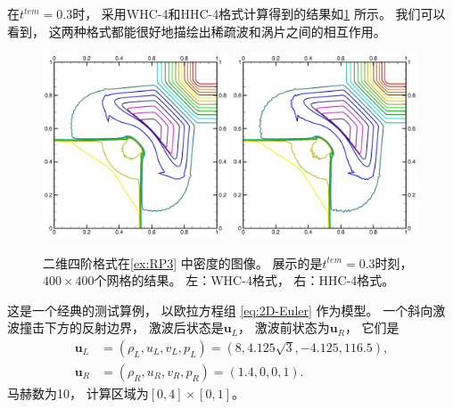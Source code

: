 在$t^{tem}=0.3$时，
采用WHC-4和HHC-4格式计算得到的结果如\cref{fig:RP3} 所示。
我们可以看到，
这两种格式都能很好地描绘出稀疏波和涡片之间的相互作用。

\begin{figure}[htbp]
  \centering
  \includegraphics[width=0.49\textwidth]{fig/2D/RP15_S2O4-WHC4_CFL0.600000.pdf}
  \includegraphics[width=0.49\textwidth]{fig/2D/RP15_S2O4-HHC4theta20_CFL0.600000.pdf}
  \caption{二维四阶格式在\cref{ex:RP3} 中密度的图像。
    展示的是$t^{tem}=0.3$时刻，
    \\$400 \times 400$个网格的结果。
    左：WHC-4格式，
    右：HHC-4格式。
  }
  \label{fig:RP3}
\end{figure}

\begin{example}[二维欧拉方程组的双马赫反射问题]
  \label{ex:DoubleMach}
  这是一个经典的测试算例，
  以欧拉方程组 \cref{eq:2D-Euler} 作为模型。
  一个斜向激波撞击下方的反射边界，
  激波后状态是${\bm u}_L$，
  激波前状态为${\bm u}_R$，
  它们是
  \begin{align}
    {\bm u}_L & =(\rho_L, u_L, v_L, p_L)= (8, 4.125\sqrt{3}, -4.125, 116.5), \\
    {\bm u}_R & =(\rho_R, u_R, v_R, p_R)= (1.4, 0, 0, 1).
  \end{align}
  马赫数为10，
  计算区域为$[0,4]\times[0,1]$。
\end{example}


